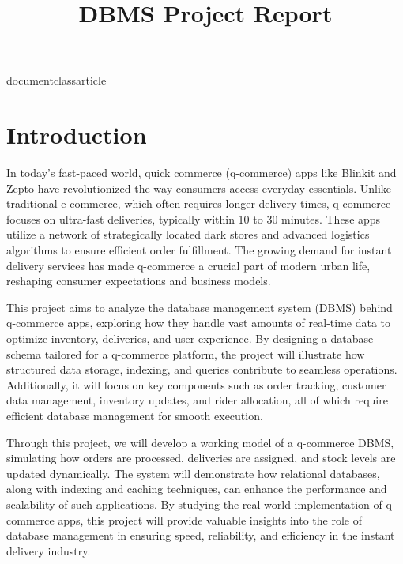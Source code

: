 documentclass{article}
\usepackage{tikz}
\usetikzlibrary{arrows,shapes,positioning,shadows,trees}
\usepackage{graphicx}
\usepackage{hyperref}


\title{\textbf{DBMS Project Report}}
\maketitle
\pagebreak



\tableofcontents
\pagebreak

\section{Introduction}
In today's fast-paced world, quick commerce (q-commerce) apps like Blinkit and Zepto have revolutionized the way consumers access everyday essentials. Unlike traditional e-commerce, which often requires longer delivery times, q-commerce focuses on ultra-fast deliveries, typically within 10 to 30 minutes. These apps utilize a network of strategically located dark stores and advanced logistics algorithms to ensure efficient order fulfillment. The growing demand for instant delivery services has made q-commerce a crucial part of modern urban life, reshaping consumer expectations and business models.\newline

\noindent
This project aims to analyze the database management system (DBMS) behind q-commerce apps, exploring how they handle vast amounts of real-time data to optimize inventory, deliveries, and user experience. By designing a database schema tailored for a q-commerce platform, the project will illustrate how structured data storage, indexing, and queries contribute to seamless operations. Additionally, it will focus on key components such as order tracking, customer data management, inventory updates, and rider allocation, all of which require efficient database management for smooth execution.\newline

\noindent
Through this project, we will develop a working model of a q-commerce DBMS, simulating how orders are processed, deliveries are assigned, and stock levels are updated dynamically. The system will demonstrate how relational databases, along with indexing and caching techniques, can enhance the performance and scalability of such applications. By studying the real-world implementation of q-commerce apps, this project will provide valuable insights into the role of database management in ensuring speed, reliability, and efficiency in the instant delivery industry.

